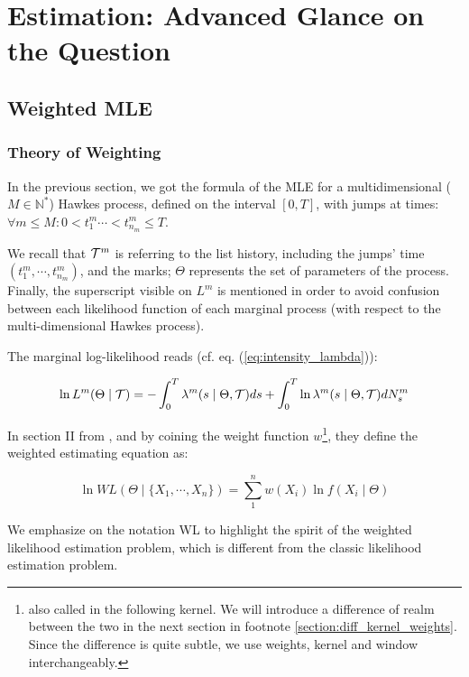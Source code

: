 
\chapter{Estimation: Advanced Glance on the Question}
\section{Weighted MLE}
\subsection{Theory of Weighting}
In the previous section, we got the formula of the MLE for a multidimensional ($ M \in \mathbb N^*$) Hawkes process, defined on the interval $[0,T]$, with jumps at times: $ \forall m \leq M: 0 < t_{1}^m \cdots < t_{n_m}^m \leq T $.

We recall that $ \mathcal{T}^m $ is referring to the list history, including the jumps' time $( t_{1}^m, \cdots , t_{n_m}^m ) $, and the marks; $\Theta$ represents the set of parameters of the process. Finally, the superscript visible on $L^m$ is mentioned in order to avoid confusion between each likelihood function of each marginal process (with respect to the multi-dimensional Hawkes process). 

The marginal log-likelihood reads (cf. eq. (\ref{eq:intensity_lambda})):


\begin{equation}
\ln L^m( \Theta \mid \mathcal{T} ) = - \int_0^T \lambda^{m} ( s \mid \Theta , \mathcal{T} ) ds + \int_0^T \ln \lambda^{m}( s \mid \Theta , \mathcal{T} ) d N_s^m \label{eq:log_likelihood}
\end{equation}



In section II from \cite{weighted_likelihood}, and by coining the weight function $w$\footnote{also called in the following kernel. We will introduce a difference of realm between the two in the next section in footnote \ref{section:diff_kernel_weights}. Since the difference is quite subtle, we use weights, kernel and window interchangeably.}, they define the weighted estimating equation as:

\begin{equation}
\ln W L ( \Theta \mid \{ X_1, \cdots, X_n \} ) = \sum_1^n  w(X_i) \ln f( X_i \mid \Theta ) 
\end{equation}

We emphasize on the notation WL to highlight the spirit of the weighted likelihood estimation problem, which is different from the classic likelihood estimation problem.


